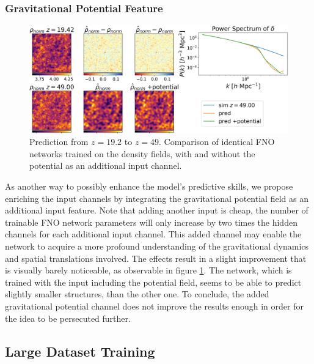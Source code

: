 \documentclass{article}
\begin{document}
\subsubsection{Gravitational Potential Feature}

\begin{figure}[h]
    \centering
    \includegraphics[width=0.7\linewidth]{img/compare_potential_4.png}
    \caption{Prediction from $z=19.2$ to $z=49$. Comparison of identical FNO networks trained on the density fields, with and without the potential as an additional input channel.}
    \label{fig:potential}
\end{figure}

As another way to possibly enhance the model's predictive skills, we propose enriching the input channels by integrating the gravitational potential field as an additional input feature. Note that adding another input is cheap, the number of trainable FNO network parameters will only increase by two times the hidden channels for each additional input channel. This added channel may enable the network to acquire a more profound understanding of the gravitational dynamics and spatial translations involved. The effects result in a slight improvement that is visually barely noticeable, as observable in figure \ref{fig:potential}. The network, which is trained with the input including the potential field, seems to be able to predict slightly smaller structures, than the other one. To conclude, the added gravitational potential channel does not improve the results enough in order for the idea to be persecuted further.



\subsection{Large Dataset Training}
\end{document}

